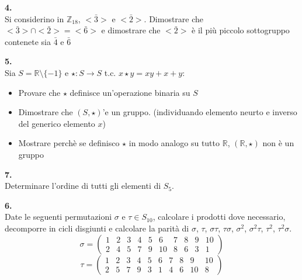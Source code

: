 \documentclass[italian,a4paper,11pt]
{article}
\newcommand{\Z}{\mathbb Z}
\newcommand{\R}{\mathbb{R}}
\newcommand{\acc}{\`}
\begin{document}
\vspace{0.4cm}
\noindent
\begin{Ex}\textbf{ 4.}\\
Si considerino in $\Z_{18}$, $<\bar 3>$ e $<\bar 2>$. Dimostrare che $<\bar 3>\cap <\bar 2>=<\bar 6>$ e dimostrare che $<\bar2>$ \acc e il pi\acc u piccolo sottogruppo contenete sia $\bar 4$ e $\bar 6$
\end{Ex}
\vspace{0.4cm}

\noindent
\begin{Ex}\textbf{ 5.}\\
Sia $S=\R \setminus \{-1\}$ e $\star : S \longrightarrow S$ t.c. $x\star y= xy+x+y$:
\begin{itemize}
\item Provare che $\star$ definisce un'operazione binaria su $S$
\item Dimostrare che $(S,\star)$'e un gruppo. (individuando elemento neurto e inverso del generico elemento $x$)
\item Mostrare perch\acc  e se definisco $\star$ in modo analogo su tutto $\R$, $(\R,\star)$ non \acc e un gruppo
\end{itemize}
\end{Ex}

\vspace{0.4cm}
\noindent
\begin{Ex}\textbf{ 7.}\\
Determinare l'ordine di tutti gli elementi di $S_5$.
\end{Ex}

\noindent
\begin{Ex}\textbf{ 6.}\\
Date le seguenti permutazioni $\sigma$ e $\tau \in S_{10}$, calcolare i prodotti dove necessario, decomporre in cicli disgiunti e calcolare la parit\acc a di $\sigma$, $\tau$, $\sigma\tau$, $\tau\sigma$, $\sigma^2$, $\sigma^2\tau$, $\tau^2$, $\tau^2\sigma$.
$$\sigma=\left(\begin{array}{cccccccccc} 1 & 2 & 3 & 4 & 5 & 6 & 7 & 8 & 9 & 10 \\ 2 & 4 & 5 & 7 & 9 & 10 & 8 & 6 & 3 & 1 \end{array} \right )$$
$$\tau=\left(\begin{array}{cccccccccc} 1 & 2 & 3 & 4 & 5 & 6 & 7 & 8 & 9 & 10 \\ 2 & 5 & 7 & 9 & 3 & 1 & 4 & 6 & 10 & 8 \end{array} \right )$$
\end{Ex}
\end{document}
